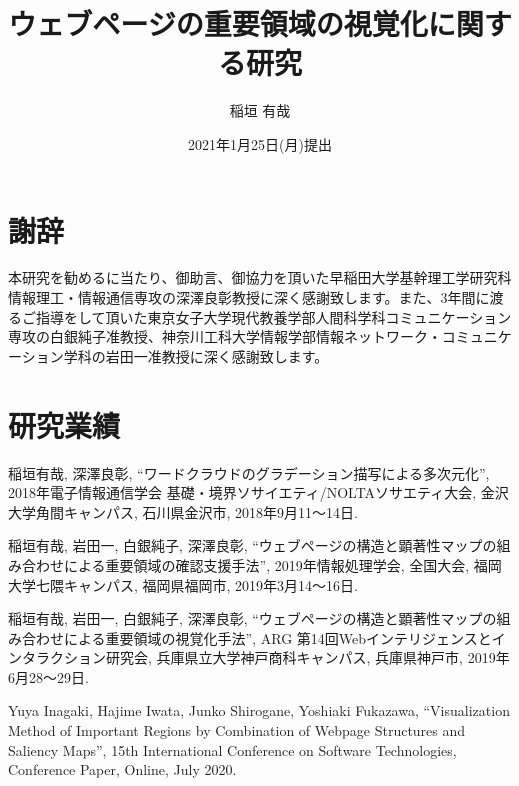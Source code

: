 \documentclass[a4j, 12pt]{jsarticle}
\title{ウェブページの重要領域の視覚化に関する研究}
\date{2021年1月25日(月)提出}
\author{稲垣 有哉}
\begin{document}
\pagestyle{empty}
\maketitle

\setcounter{page}{1}
\pagestyle{plain}
\setcounter{tocdepth}{3} %
\tableofcontents

\newpage
{}
\setcounter{page}{1} %
\pagestyle{fancy}


% 
% 
% 
% 
% 
% 
% 
% 

\newpage
\renewcommand{\baselinestretch}{1.5}
\section*{謝辞}
\par 本研究を勧めるに当たり、御助言、御協力を頂いた早稲田大学基幹理工学研究科情報理工・情報通信専攻の深澤良彰教授に深く感謝致します。また、3年間に渡るご指導をして頂いた東京女子大学現代教養学部人間科学科コミュニケーション専攻の白銀純子准教授、神奈川工科大学情報学部情報ネットワーク・コミュニケーション学科の岩田一准教授に深く感謝致します。

\newpage



\newpage
\section*{研究業績}
\par 稲垣有哉, 深澤良彰, “ワードクラウドのグラデーション描写による多次元化”, 2018年電子情報通信学会 基礎・境界ソサイエティ/NOLTAソサエティ大会, 金沢大学角間キャンパス, 石川県金沢市, 2018年9月11～14日.\\
\par 稲垣有哉, 岩田一, 白銀純子, 深澤良彰, “ウェブページの構造と顕著性マップの組み合わせによる重要領域の確認支援手法”, 2019年情報処理学会, 全国大会, 福岡大学七隈キャンパス, 福岡県福岡市, 2019年3月14～16日.\\
\par 稲垣有哉, 岩田一, 白銀純子, 深澤良彰, “ウェブページの構造と顕著性マップの組み合わせによる重要領域の視覚化手法”, ARG 第14回Webインテリジェンスとインタラクション研究会, 兵庫県立大学神戸商科キャンパス, 兵庫県神戸市, 2019年6月28～29日.\\
\par Yuya Inagaki, Hajime Iwata, Junko Shirogane, Yoshiaki Fukazawa, “Visualization Method of Important Regions by Combination of Webpage Structures and Saliency Maps”, 15th International Conference on Software Technologies, Conference Paper, Online, July 2020.\\


\end{document}
